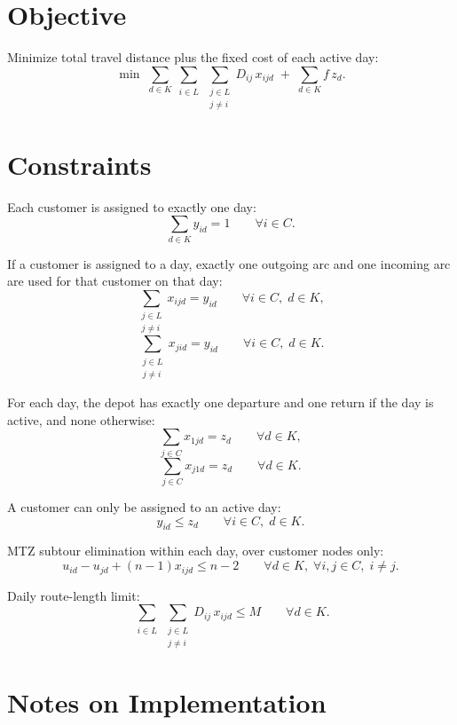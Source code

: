 \section*{Objective}

Minimize total travel distance plus the fixed cost of each active day:
\[
\min \;
\sum_{d \in K} \sum_{\substack{i \in L \\ }} \sum_{\substack{j \in L \\ j \neq i}} D_{ij}\, x_{ijd}
\;+\;
\sum_{d \in K} f\, z_d .
\]

\section*{Constraints}

Each customer is assigned to exactly one day:
\[
\sum_{d \in K} y_{id} = 1
\qquad \forall i \in C.
\]

If a customer is assigned to a day, exactly one outgoing arc and one incoming arc are used for that customer on that day:
\[
\sum_{\substack{j \in L \\ j \neq i}} x_{ijd} = y_{id}
\qquad \forall i \in C,\; d \in K,
\]
\[
\sum_{\substack{j \in L \\ j \neq i}} x_{jid} = y_{id}
\qquad \forall i \in C,\; d \in K.
\]

For each day, the depot has exactly one departure and one return if the day is active, and none otherwise:
\[
\sum_{j \in C} x_{1jd} = z_d
\qquad \forall d \in K,
\]
\[
\sum_{j \in C} x_{j1d} = z_d
\qquad \forall d \in K.
\]

A customer can only be assigned to an active day:
\[
y_{id} \le z_d
\qquad \forall i \in C,\; d \in K.
\]

MTZ subtour elimination within each day, over customer nodes only:
\[
u_{id} - u_{jd} + (n-1)x_{ijd} \le n-2
\qquad \forall d \in K,\; \forall i,j \in C,\; i \neq j.
\]

Daily route-length limit:
\[
\sum_{\substack{i \in L \\ }} \sum_{\substack{j \in L \\ j \neq i}} D_{ij}\, x_{ijd} \le M
\qquad \forall d \in K.
\]

\section*{Notes on Implementation}

